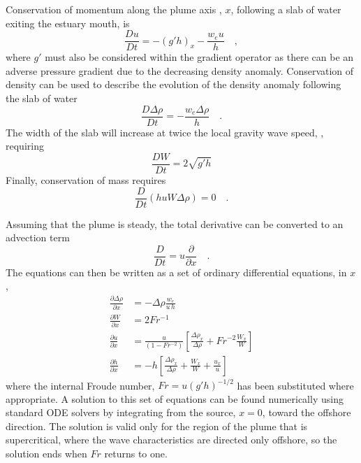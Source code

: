 \documentclass[12pt]{article}
\begin{document}
{Conservation of momentum along the plume axis , $x$, following a slab of water exiting the estuary mouth, is
\begin{equation}
    \frac{Du}{Dt} = -(g' h)_x - \frac{w_e u}{h} \quad ,
\end{equation}
where $g'$ must also be considered within the gradient operator as there can be an adverse pressure gradient due to the decreasing density anomaly. Conservation of density can be used to describe the evolution of the density anomaly following the slab of water
\begin{equation}
    \frac{D \Delta\rho}{Dt} = -\frac{w_e \Delta\rho}{h} \quad .
\end{equation}
The width of the slab will increase at twice the local gravity wave speed, \citep[see][as discussed above]{hetland.macdonald:08}, requiring
\begin{equation}
    \frac{D W}{Dt} = 2 \sqrt{g' h}
\end{equation}
Finally, conservation of mass requires
\begin{equation}
    \frac{D}{Dt}\left( h u W \Delta\rho \right) = 0 \quad .
\end{equation}

Assuming that the plume is steady, the total derivative can be converted to an advection term
\begin{equation}
    \frac{D}{Dt} = u\frac{\partial}{\partial x} \quad .
\end{equation}
The equations can then be written as a set of ordinary differential equations, in $x$,
\begin{align}
\frac{\partial \Delta\rho}{\partial x} &= - \Delta \rho \frac{w_e}{u\,h} \label{eq:mass_sys}\\
\frac{\partial W}{\partial x} &=  2 Fr^{-1}\label{eq:width_sys}\\
\frac{\partial u}{\partial x} &= \frac{u}{(1 - Fr^{-2})}\left[ \frac{\Delta \rho_x}{\Delta \rho} + Fr^{-2} \frac{W_x}{W} \right] \label{eq:moment_sys}\\
\frac{\partial h}{\partial x} &= - h \left[  \frac{\Delta\rho_x}{\Delta\rho} + \frac{W_x}{W} +  \frac{u_x}{u} \right] \label{eq:cont_sys}
\end{align}
where the internal Froude number, $Fr = u (g' h)^{-1/2}$ has been substituted where appropriate. A solution to this set of equations can be found numerically using standard ODE solvers by integrating from the source, $x=0$, toward the offshore direction. The solution is valid only for the region of the plume that is supercritical, where the wave characteristics are directed only offshore, so the solution ends when $Fr$ returns to one.

}
\end{document}
